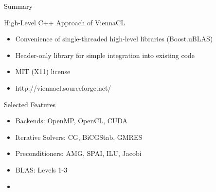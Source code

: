 















\begin{frame}{Summary}
 
 \begin{block}{High-Level C++ Approach of ViennaCL}
  \begin{itemize}
   \item Convenience of single-threaded high-level libraries (Boost.uBLAS)
   \item Header-only library for simple integration into existing code
   \item MIT (X11) license
   \item \centering http://viennacl.sourceforge.net/
  \end{itemize}
 \end{block}

 \begin{block}{Selected Features}
  \begin{itemize}
   \item Backends: OpenMP, OpenCL, CUDA
   \item Iterative Solvers: CG, BiCGStab, GMRES
   \item Preconditioners: AMG, SPAI, ILU, Jacobi
   \item BLAS: Levels 1-3
   \item 
  \end{itemize}
 \end{block}

\end{frame}
